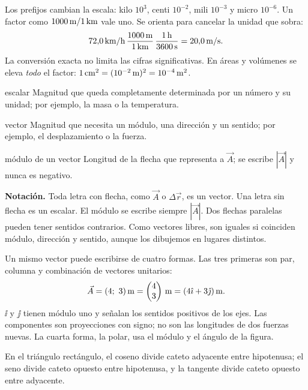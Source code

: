 \documentclass[11pt,a4paper]{article}
\begin{document}
Los prefijos cambian la escala: kilo $10^3$, centi $10^{-2}$, mili $10^{-3}$ y
micro $10^{-6}$. Un factor como $1000\,\mathrm{m}/1\,\mathrm{km}$ vale uno.
Se orienta para cancelar la unidad que sobra:
\[
72{,}0\,\mathrm{km/h}\,
\frac{1000\,\mathrm{m}}{1\,\mathrm{km}}\,
\frac{1\,\mathrm{h}}{3600\,\mathrm{s}}=20{,}0\,\mathrm{m/s}.
\]
La conversi\'on exacta no limita las cifras significativas. En \'areas y vol\'umenes
se eleva \emph{todo} el factor: $1\,\mathrm{cm^2}=(10^{-2}\,\mathrm{m})^2=10^{-4}\,\mathrm{m^2}$.

\begin{defbox}{escalar}
Magnitud que queda completamente determinada por un n\'umero y su unidad; por ejemplo,
la masa o la temperatura.
\end{defbox}
\begin{defbox}{vector}
Magnitud que necesita un m\'odulo, una direcci\'on y un sentido; por ejemplo,
el desplazamiento o la fuerza.
\end{defbox}
\begin{defbox}{m\'odulo de un vector}
Longitud de la flecha que representa a $\vec A$; se escribe $|\vec A|$ y nunca es negativo.
\end{defbox}
\textbf{Notaci\'on.} Toda letra con flecha, como $\vec A$ o $\Delta\vec r$, es un vector.
Una letra sin flecha es un escalar. El m\'odulo se escribe siempre $|\vec A|$.
Dos flechas paralelas pueden tener sentidos contrarios.
Como vectores libres, son iguales si coinciden m\'odulo, direcci\'on y sentido,
aunque los dibujemos en lugares distintos.

Un mismo vector puede escribirse de cuatro formas. Las tres primeras son par,
columna y combinaci\'on de vectores unitarios:
\[
\vec A=(4;\ 3)\,\mathrm{m}
=\begin{pmatrix}4\\3\end{pmatrix}\,\mathrm{m}
=(4\hat{\imath}+3\hat{\jmath})\,\mathrm{m}.
\]
$\ii$ y $\jj$ tienen m\'odulo uno y se\~nalan los sentidos positivos de los ejes.
Las componentes son proyecciones con signo; no son las longitudes de dos fuerzas nuevas.
La cuarta forma, la polar, usa el m\'odulo y el \'angulo de la figura.
\begin{center}
\end{center}
En el tri\'angulo rect\'angulo, el coseno divide cateto adyacente entre hipotenusa;
el seno divide cateto opuesto entre hipotenusa, y la tangente divide
cateto opuesto entre adyacente.
\end{document}
